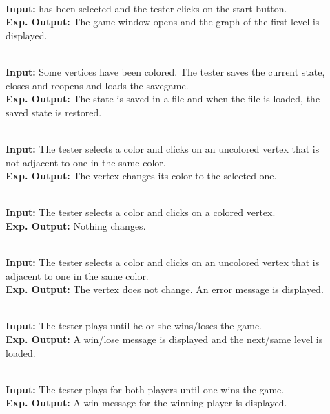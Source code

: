 \pagebreak
\begin{description}
	\item[] \textbf{} \\
	\textbf{Input:} \graphcoloring has been selected and the tester clicks on the start button. \\
	\textbf{Exp. Output:} The game window opens and the graph of the first level is displayed.
	
	\item[] \textbf{} \\
	\textbf{Input:} Some vertices have been colored. The tester saves the current state, closes and reopens \graphcoloring and loads the savegame. \\
	\textbf{Exp. Output:} The state is saved in a file and when the file is loaded, the saved state is restored.
	
	\item[] \textbf{} \\
	\textbf{Input:} The tester selects a color and clicks on an uncolored vertex that is not adjacent to one in the same color. \\
	\textbf{Exp. Output:} The vertex changes its color to the selected one.
	
	\item[] \textbf{} \\
	\textbf{Input:} The tester selects a color and clicks on a colored vertex. \\
	\textbf{Exp. Output:} Nothing changes.
	
	\item[] \textbf{} \\
	\textbf{Input:} The tester selects a color and clicks on an uncolored vertex that is adjacent to one in the same color. \\
	\textbf{Exp. Output:} The vertex does not change. An error message is displayed.
	
	\item[] \textbf{} \\
	\textbf{Input:} The tester plays until he or she wins/loses the game. \\
	\textbf{Exp. Output:} A win/lose message is displayed and the next/same level is loaded.

	\item[] \textbf{} \\
	\textbf{Input:} The tester plays for both players until one wins the game. \\
	\textbf{Exp. Output:} A win message for the winning player is displayed.
	
\end{description}

